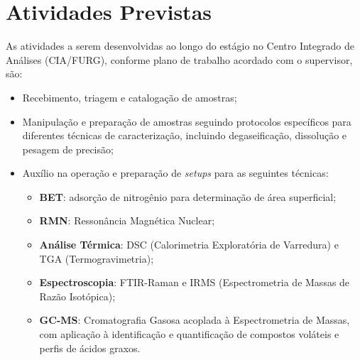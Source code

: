 
\section{Atividades Previstas}

As atividades a serem desenvolvidas ao longo do estágio no Centro Integrado de
Análises (CIA/FURG), conforme plano de trabalho acordado com o supervisor, são:

\begin{itemize}
    \item Recebimento, triagem e catalogação de amostras;
    \item Manipulação e preparação de amostras seguindo protocolos específicos
          para diferentes técnicas de caracterização, incluindo degaseificação,
          dissolução e pesagem de precisão;
    \item Auxílio na operação e preparação de \textit{setups} para as seguintes técnicas:
    \begin{itemize}
        \item \textbf{BET}: adsorção de nitrogênio para determinação de área superficial;
        \item \textbf{RMN}: Ressonância Magnética Nuclear;
        \item \textbf{Análise Térmica}: DSC (Calorimetria Exploratória de Varredura)
              e TGA (Termogravimetria);
        \item \textbf{Espectroscopia}: FTIR-Raman e IRMS (Espectrometria de Massas
              de Razão Isotópica);
        \item \textbf{GC-MS}: Cromatografia Gasosa acoplada à Espectrometria de Massas,
              com aplicação à identificação e quantificação de compostos voláteis
              e perfis de ácidos graxos.
    \end{itemize}
\end{itemize}
